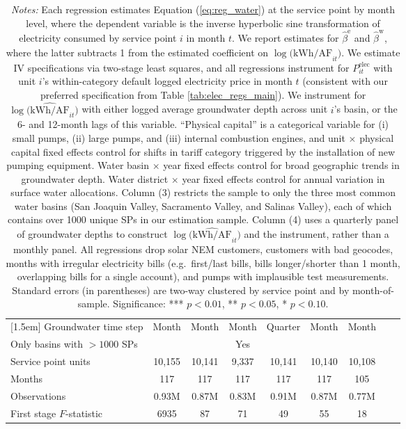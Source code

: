 \begin{table}[t!]
\begin{adjustbox}{center}
\begin{tabular}{lcccccccc}
[1.5em] 
Groundwater time step & Month & Month & Month & Quarter & Month & Month  \\ 
[0.1em] 
Only basins with $>1000$ SPs &  &  & Yes &  &  &   \\ 
[1.5em] 
Service point units & 10,155 & 10,141 & 9,337 & 10,141 & 10,140 & 10,108  \\ 
[0.1em] 
Months  & 117 & 117 & 117 & 117 & 117 & 105 \\ 
[0.1em] 
Observations & 0.93M & 0.87M & 0.83M & 0.91M & 0.87M & 0.77M \\ 
[0.1em] 
First stage $F$-statistic & 6935 & 87 & 71 & 49 & 55 & 18 \\ 
[0.15em]
\hline
\end{tabular}
\end{adjustbox}
\captionsetup{width=\textwidth}
\caption*{\scriptsize \emph{Notes:} 
Each regression estimates Equation (\ref{eq:reg_water}) at the service point by month level,
where the dependent variable is the inverse hyperbolic sine transformation 
of electricity consumed by service point $i$ in month $t$.
We report estimates for $\hat\beta^{\text{e}}$ and $\hat\beta^{\text{w}}$, where the latter subtracts 
1 from the estimated coefficient on $\log \big(\widehat{\text{kWh}\big/\text{AF}}_{it}\big)$.
We estimate IV specifications via two-stage least squares, and all regressions instrument 
for $P^{\text{elec}}_{it}$ with unit $i$'s within-category default logged electricity price 
in month $t$ (consistent with our preferred specification from Table \ref{tab:elec_regs_main}).
We instrument for $\log \big(\widehat{\text{kWh}\big/\text{AF}}_{it}\big)$ with either logged 
average groundwater depth across unit $i$'s basin, or the 6- and 12-month lags of this variable.
``Physical capital'' is a categorical variable for (i) small pumps, (ii) large pumps, and (iii) 
internal combustion engines, and unit $\times$ physical capital fixed effects control for shifts 
in tariff category triggered by the installation of new pumping equipment.
Water basin $\times$ year fixed effects control for broad geographic trends in groundwater depth.
Water district $\times$ year fixed effects control for annual variation in surface water allocations.
Column (3) restricts the sample to only the three most common water basins (San Joaquin Valley, 
Sacramento Valley, and Salinas Valley), each of which contains over 1000 unique SPs in our estimation sample.
Column (4) uses a quarterly panel of groundwater depths to construct $\log \big(\widehat{\text{kWh}\big/\text{AF}}_{it}\big)$ 
and the instrument, rather than a monthly panel.
All regressions drop solar NEM customers, customers with bad geocodes, months with irregular electricity bills 
(e.g.\ first/last bills, bills longer/shorter than 1 month, overlapping bills for a single account),
and pumps with implausible test measurements.
Standard errors (in parentheses) are two-way clustered by service point and by month-of-sample.
Significance: *** $p < 0.01$, ** $p < 0.05$, * $p < 0.10$.
}
\end{table}
